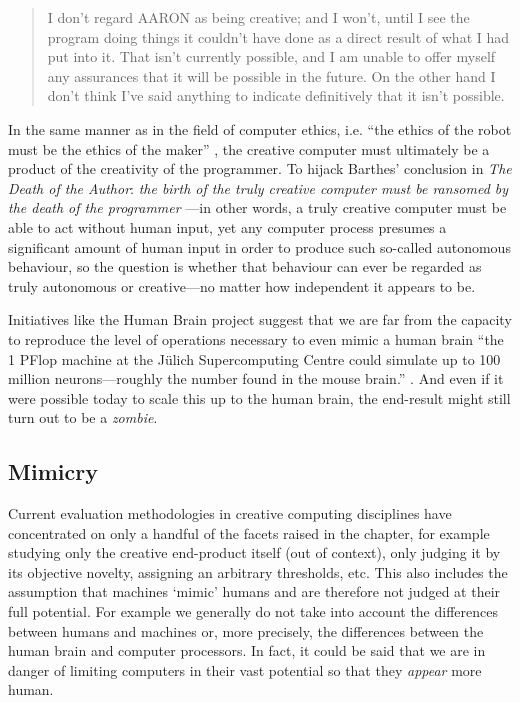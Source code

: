 \begin{quotation}
  I don't regard AARON as being creative; and I won't, until I see the program doing things it couldn't have done as a direct result of what I had put into it. That isn't currently possible, and I am unable to offer myself any assurances that it will be possible in the future. On the other hand I don't think I've said anything to indicate definitively that it isn't possible. 
\end{quotation}

In the same manner as in the field of computer ethics, i.e. ``the ethics of the robot must be the ethics of the maker'' \autocite{Mcbride2012}, the creative computer must ultimately be a product of the creativity of the programmer. To hijack Barthes' conclusion in \textit{The Death of the Author}: \emph{the birth of the truly creative computer must be ransomed by the death of the programmer} \autocite{Barthes1967}---in other words, a truly creative computer must be able to act without human input, yet any computer process presumes a significant amount of human input in order to produce such so-called autonomous behaviour, so the question is whether that behaviour can ever be regarded as truly autonomous or creative---no matter how independent it appears to be.

Initiatives like the Human Brain project suggest that we are far from the capacity to reproduce the level of operations necessary to even mimic a human brain ``the \num{1} PFlop machine at the J{\"u}lich Supercomputing Centre could simulate up to \num{100} million neurons---roughly the number found in the mouse brain.'' \autocite{Walker2012}. And even if it were possible today to scale this up to the human brain, the end-result might still turn out to be a \emph{zombie}.


\subsection{Mimicry}
\label{s:mimicry}

Current evaluation methodologies in creative computing disciplines have concentrated on only a handful of the facets raised in the  chapter, for example studying only the creative end-product itself (out of context), only judging it by its objective novelty, assigning an arbitrary thresholds, etc. This also includes the assumption that machines `mimic' humans and are therefore not judged at their full potential. For example we generally do not take into account the differences between humans and machines or, more precisely, the differences between the human brain and computer processors. In fact, it could be said that we are in danger of limiting computers in their vast potential so that they \emph{appear} more human.

